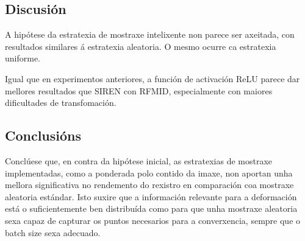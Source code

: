 





\subsection{Discusión}
\label{subsec:Discusion-sampling}

A hipótese da estratexia de mostraxe intelixente non parece ser axeitada, con resultados similares á estratexia aleatoria. 
O mesmo ocurre ca estratexia uniforme.

Igual que en experimentos anteriores, a función de activación ReLU parece dar mellores resultados que SIREN con RFMID, especialmente con maiores dificultades de transfomación.


\subsection{Conclusións}
\label{subsec:Conclusions-sampling}
Conclúese que, en contra da hipótese inicial, as estratexias de mostraxe implementadas, como a ponderada polo contido da imaxe, non aportan unha mellora significativa no rendemento do rexistro en comparación coa mostraxe aleatoria estándar. Isto suxire que a información relevante para a deformación está o suficientemente ben distribuída como para que unha mostraxe aleatoria sexa capaz de capturar os puntos necesarios para a converxencia, sempre que o batch size sexa adecuado.



